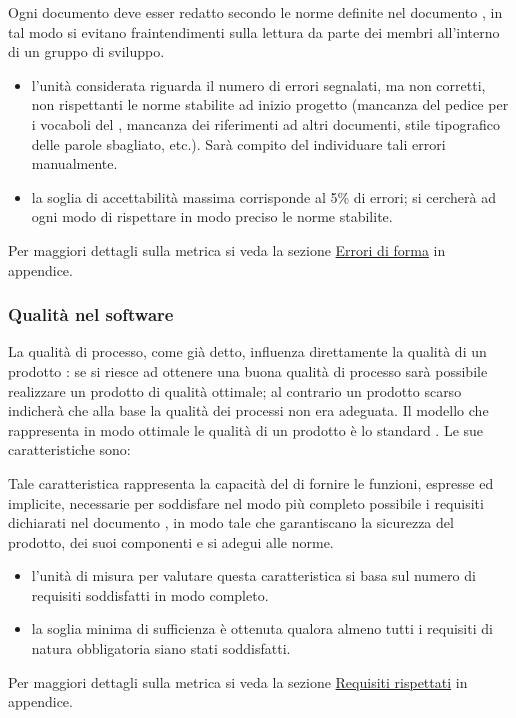 \documentclass[a4paper, titlepage]{article}
\begin{document}
Ogni documento deve esser redatto secondo le norme definite nel documento , in tal modo si evitano fraintendimenti sulla lettura da parte dei membri all'interno di un gruppo di sviluppo.
\begin{itemize}
\item {} l'unità considerata riguarda il numero di errori  segnalati, ma non corretti, non rispettanti le norme stabilite ad inizio progetto (mancanza del pedice per i vocaboli del , mancanza dei riferimenti ad altri documenti, stile tipografico delle parole sbagliato, etc.). Sarà compito del  individuare tali errori manualmente.
\item {} la soglia di accettabilità massima corrisponde al 5\% di errori; si cercherà ad ogni modo di rispettare in modo preciso le norme stabilite.
\end{itemize}
Per maggiori dettagli sulla metrica si veda la sezione \hyperref[par:errfor]{Errori di forma} in appendice.

\subsubsection{Qualità nel software}
La qualità di processo, come già detto, influenza direttamente la qualità di un prodotto : se si riesce ad ottenere una buona qualità di processo sarà possibile realizzare un prodotto di qualità ottimale; al contrario un prodotto scarso indicherà che alla base la qualità dei processi non era adeguata.
\newline Il modello che rappresenta in modo ottimale le qualità di un prodotto  è lo standard .
\newline Le sue caratteristiche sono:

Tale caratteristica rappresenta la capacità del  di fornire le funzioni, espresse ed implicite, necessarie per soddisfare nel modo più completo possibile i requisiti dichiarati nel documento \ARdoc, in modo tale che garantiscano la sicurezza del prodotto, dei suoi componenti e si adegui alle norme.
\begin{itemize}
\item {} l'unità di misura per valutare questa caratteristica si basa sul numero di requisiti soddisfatti in modo completo.
\item {} la soglia minima di sufficienza è ottenuta qualora almeno tutti i requisiti di natura obbligatoria siano stati soddisfatti.
\end{itemize}
Per maggiori dettagli sulla metrica si veda la sezione \hyperref[par:req]{Requisiti rispettati} in appendice.
\end{document}
